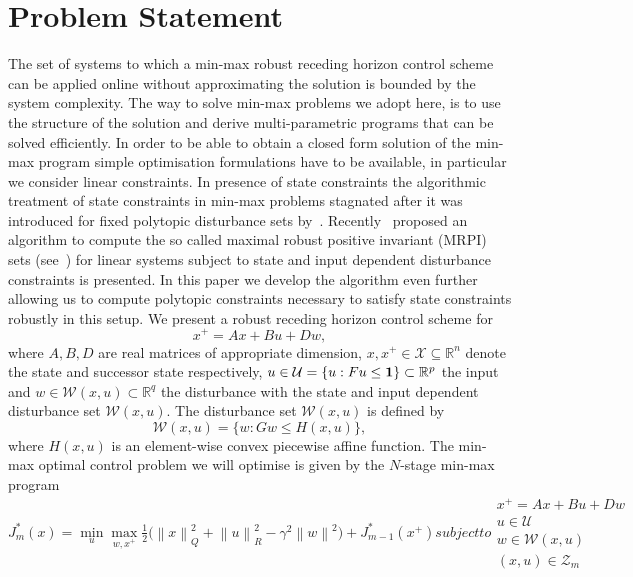 \documentclass{ifacconf}
\providecommand{\norm}[1]{\left\|#1\right\|}
\begin{document}
\section{Problem Statement}\label{sec:problem:statement}
The set of systems to which a min-max robust receding horizon control scheme can be applied online 
without approximating the solution is bounded by the system complexity. The way to solve min-max problems we 
adopt here, is to use the structure of the solution and derive multi-parametric programs that can be solved 
efficiently. In order to be able to obtain a closed form solution of the min-max program simple optimisation 
formulations have to be available, in particular we consider linear constraints. In presence of state constraints 
the algorithmic treatment of state constraints in min-max problems stagnated after it was introduced for fixed 
polytopic disturbance sets by~\cite{Bertsekas:1971}. Recently~\cite{Schaich:2015} proposed an algorithm to compute the
so called maximal robust positive invariant (MRPI) sets (see~\cite{blanchini:2007}) for linear systems subject to state 
and input dependent disturbance constraints is presented. In this paper we develop the algorithm even further allowing 
us to compute polytopic constraints necessary to satisfy state constraints robustly in this setup. We present a 
robust receding horizon control scheme for
%
\begin{equation}\label{eq:system:equation}
	x^+ = A x + B u + D w,
\end{equation}
%
where $A,B,D$ are real matrices of appropriate dimension, $x, x^+\in\mathcal X\subseteq\mathbb R^n$ denote the state 
and successor state respectively, $u\in\mathcal U=\{u:Fu\leq{\bf{1}}\}\subset\mathbb R^p$ the input and $w\in\mathcal W(x,u)
\subset\mathbb R^q$ the disturbance with the state and input dependent disturbance set $\mathcal W(x,u)$. The disturbance 
set $\mathcal W(x,u)$ is defined by
%
\begin{equation}\label{eq:PWA:def:disturbance}
	\mathcal W(x,u) = \{w: Gw \leq H(x,u)\},
\end{equation}
%
where $H(x,u)$ is an element-wise convex piecewise affine function. The min-max optimal control problem
we will optimise is given by the $N$-stage min-max program
%
\begin{subequations}\label{eq:the:problem}%
\begin{equation}
	J_{m}^\ast(x) = \min_u \max_{w,x^+} \tfrac{1}{2}\bigl(\norm{x}_Q^2+\norm{u}_R^2-\gamma^2
    \norm{w}^2\bigr) + J_{m-1}^\ast(x^+)
\end{equation}
subject to
\begin{gather}
	x^+ = A x + B u + D w\\
	u\in\mathcal U \\
	w\in\mathcal W(x,u) \\
	(x,u)\in\mathcal Z_m
\end{gather}
\end{subequations}
\end{document}
